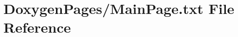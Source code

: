 \hypertarget{_main_page_8txt}{\section{Doxygen\-Pages/\-Main\-Page.txt File Reference}
\label{_main_page_8txt}
}
